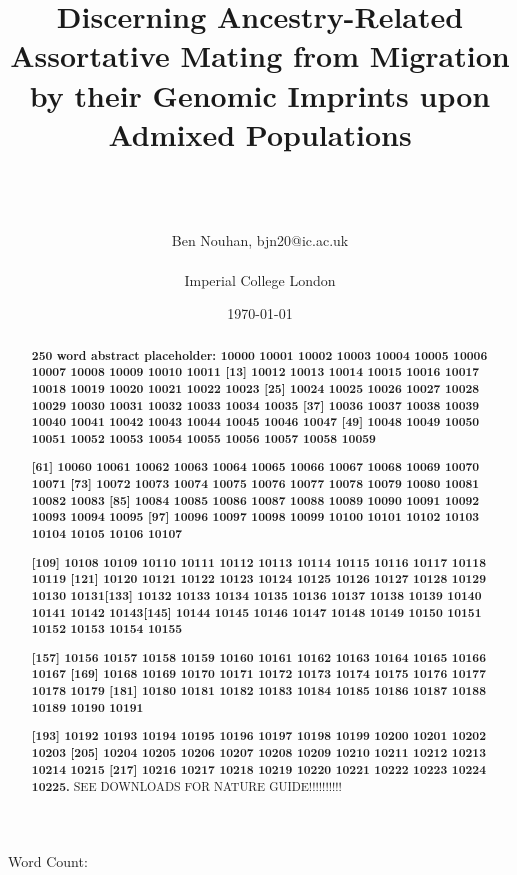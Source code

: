 \documentclass[11pt]{article}
\title{Discerning Ancestry-Related Assortative Mating from Migration by their Genomic Imprints upon Admixed Populations%
}
\author{\\ \\ \\ Ben Nouhan, bjn20@ic.ac.uk \\ \\ Imperial College London \\}
\date{\today}
\newcommand\wordcount{}
\begin{document}
\maketitle
\thispagestyle{empty}

\vspace{4mm}
\centerline{Word Count: \wordcount}

\vspace{8mm}
\onehalfspacing
\renewcommand{\abstractname}{\vspace{-\baselineskip}} %

\begin{abstract}
    \linenumbers
    \small
    \noindent
    \textbf{
        250 word abstract placeholder: 10000 10001 10002 10003 10004 10005 10006 10007 10008 10009 10010 10011 [13] 10012 10013 10014 10015 10016 10017 10018 10019 10020 10021 10022 10023 [25] 10024 10025 10026 10027 10028 10029 10030 10031 10032 10033 10034 10035 [37] 10036 10037 10038 10039 10040 10041 10042 10043 10044 10045 10046 10047 [49] 10048 10049 10050 10051 10052 10053 10054 10055 10056 10057 10058 10059
        }

    \textbf{
        [61] 10060 10061 10062 10063 10064 10065 10066 10067 10068 10069 10070 10071 [73] 10072 10073 10074 10075 10076 10077 10078 10079 10080 10081 10082 10083 [85] 10084 10085 10086 10087 10088 10089 10090 10091 10092 10093 10094 10095 [97] 10096 10097 10098 10099 10100 10101 10102 10103 10104 10105 10106 10107
        }

    \textbf{
        [109] 10108 10109 10110 10111 10112 10113 10114 10115 10116 10117 10118 10119 [121] 10120 10121 10122 10123 10124 10125 10126 10127 10128 10129 10130 10131[133] 10132 10133 10134 10135 10136 10137 10138 10139 10140 10141 10142 10143[145] 10144 10145 10146 10147 10148 10149 10150 10151 10152 10153 10154 10155
        }

    \textbf{
        [157] 10156 10157 10158 10159 10160 10161 10162 10163 10164 10165 10166 10167 [169] 10168 10169 10170 10171 10172 10173 10174 10175 10176 10177 10178 10179 [181] 10180 10181 10182 10183 10184 10185 10186 10187 10188 10189 10190 10191
    }

    \textbf{
        [193] 10192 10193 10194 10195 10196 10197 10198 10199 10200 10201 10202 10203 [205] 10204 10205 10206 10207 10208 10209 10210 10211 10212 10213 10214 10215 [217] 10216 10217 10218 10219 10220 10221 10222 10223 10224 10225.
    }
    SEE DOWNLOADS FOR NATURE GUIDE!!!!!!!!!!
\end{abstract}
\end{document}
